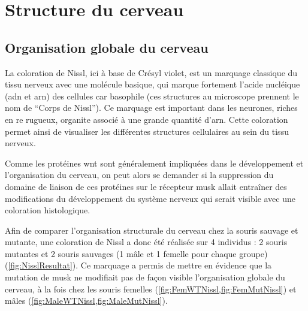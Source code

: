 \section{Structure du cerveau}
\label{sec:NisslResultat}

	\subsection{Organisation globale du cerveau}
	\label{ssec:orgaglobale}
		La coloration de Nissl, ici à base de Crésyl violet, est un marquage classique du tissu nerveux avec une molécule basique, qui marque fortement l'acide nucléique (\acrshort{adn} et \acrshort{arn}) des cellules car basophile (ces structures au microscope prennent le nom de \enquote{Corps de Nissl}). Ce marquage est important dans les neurones, riches en \gls{re} rugueux, organite associé à une grande quantité d'\acrshort{arn}. Cette coloration permet ainsi de visualiser les différentes structures cellulaires au sein du tissu nerveux.
	
		Comme les protéines \gls{wnt} sont généralement impliquées dans le développement et l'organisation du cerveau, on peut alors se demander si la suppression du domaine de liaison de ces protéines sur le récepteur \gls{musk} allait entraîner des modifications du développement du système nerveux qui serait visible avec une coloration histologique.
	
		Afin de comparer l'organisation structurale du cerveau chez la souris sauvage et mutante, une coloration de Nissl a donc été réalisée sur 4 individus : 2 souris mutantes et 2 souris sauvages (1 mâle et 1 femelle pour chaque groupe) (\cref{fig:NisslResultat}). Ce marquage a permis de mettre en évidence que la mutation de \gls{musk} ne modifiait pas de façon visible l'organisation globale du cerveau, à la fois chez les souris femelles (\cref{fig:FemWTNissl,fig:FemMutNissl}) et mâles (\cref{fig:MaleWTNissl,fig:MaleMutNissl}). 
	
